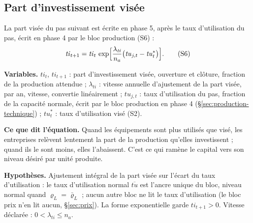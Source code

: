 \documentclass[11pt,a4paper]{article}
\newcommand{\variables}{\par\noindent\textbf{Variables.} }
\newcommand{\sens}{\par\noindent\textbf{Ce que dit l'équation.} }
\newcommand{\hyp}{\par\noindent\textbf{Hypothèses.} }
\begin{document}
\subsection{Part d'investissement visée}
\label{sec:investissement-part}
\begin{proposee}
La part visée du pas suivant est écrite en phase 5, après le taux d'utilisation du pas, écrit en phase 4 par le bloc production (S6) :
\begin{equation*}
\mathit{ti}_{t+1} = \mathit{ti}_t\, \exp\Bigl[\frac{\lambda_{\mathit{ti}}}{n_a}\bigl(\mathit{tu}_{j,t} - \mathit{tu}^\ast_t\bigr)\Bigr] . \tag{S6}
\end{equation*}

\variables $\mathit{ti}_t$, $\mathit{ti}_{t+1}$ : part d'investissement visée, ouverture et clôture, fraction de la production attendue ; $\lambda_{\mathit{ti}}$ : vitesse annuelle d'ajustement de la part visée, par an, vitesse, convertie linéairement ; $\mathit{tu}_{j,t}$ : taux d'utilisation du pas, fraction de la capacité normale, écrit par le bloc production en phase 4 (\S\ref{sec:production-technique}) ; $\mathit{tu}^\ast_t$ : taux d'utilisation visé (S2).
\sens Quand les équipements sont plus utilisés que visé, les entreprises relèvent lentement la part de la production qu'elles investissent ; quand ils le sont moins, elles l'abaissent. C'est ce qui ramène le capital vers son niveau désiré par unité produite.
\hyp Ajustement intégral de la part visée sur l'écart du taux d'utilisation : le taux d'utilisation normal $\overline{\mathit{tu}}$ est l'ancre unique du bloc, niveau normal quand $\varrho_L = \bar\varrho_L$ ; aucun autre bloc ne lit le taux d'utilisation (le bloc prix n'en lit aucun, \S\ref{sec:prix}). La forme exponentielle garde $\mathit{ti}_{t+1} > 0$. Vitesse déclarée : $0 < \lambda_{\mathit{ti}} \le n_a$.

\end{proposee}
\end{document}
